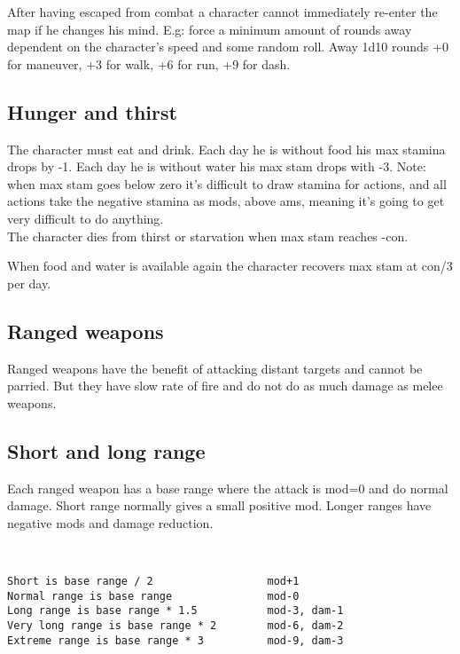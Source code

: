 After having escaped from combat a character cannot immediately re-enter the map if he changes his mind. E.g: force a minimum amount of rounds away dependent on the character's speed and some random roll. Away 1d10 rounds +0 for maneuver, +3 for walk, +6 for run, +9 for dash.


\subsection*{Hunger and thirst}
The character must eat and drink. Each day he is without food his max stamina drops by -1. Each day he is without water his max stam drops with -3. Note: when max stam goes below zero it's difficult to draw stamina for actions, and all actions take the negative stamina as mods, above ams, meaning it's going to get very difficult to do anything.\\
The character dies from thirst or starvation when max stam reaches -con.

When food and water is available again the character recovers max stam at con/3 per day.










\subsection*{Ranged weapons}
Ranged weapons have the benefit of attacking distant targets and cannot be parried. But they have slow rate of fire and do not do as much damage as melee weapons.


\subsection*{Short and long range}
Each ranged weapon has a base range where the attack is mod=0 and do normal damage. Short range normally gives a small positive mod. Longer ranges have negative mods and damage reduction.

\

\small \begin{verbatim}
Short is base range / 2                  mod+1
Normal range is base range               mod-0
Long range is base range * 1.5           mod-3, dam-1
Very long range is base range * 2        mod-6, dam-2
Extreme range is base range * 3          mod-9, dam-3
\end{verbatim} \normalsize

